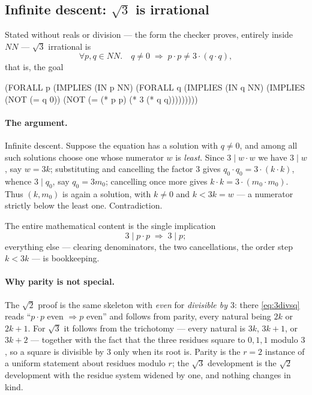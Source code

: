 \subsection{Infinite descent: \texorpdfstring{$\sqrt3$}{sqrt3} is irrational}
\label{sec:ex-sqrt3}

Stated without reals or division --- the form the checker proves, entirely
inside $\mathit{NN}$ --- $\sqrt3$ irrational is
\[
  \forall p,q \in \mathit{NN}.\quad
  q \neq 0 \;\Longrightarrow\; p\cdot p \neq 3\cdot(q\cdot q) ,
\]
that is, the goal
\begin{VNBsnip}
(FORALL p (IMPLIES (IN p NN) (FORALL q (IMPLIES (IN q NN)
  (IMPLIES (NOT (= q 0)) (NOT (= (* p p) (* 3 (* q q)))))))))
\end{VNBsnip}

\paragraph{The argument.}
Infinite descent.  Suppose the equation has a solution with $q \neq 0$, and
among all such solutions choose one whose numerator $w$ is \emph{least}.  Since
$3 \mid w\cdot w$ we have $3 \mid w$, say $w = 3k$; substituting and cancelling
the factor $3$ gives $q_0\cdot q_0 = 3\cdot(k\cdot k)$, whence $3 \mid q_0$, say
$q_0 = 3m_0$; cancelling once more gives $k\cdot k = 3\cdot(m_0\cdot m_0)$.  Thus
$(k,m_0)$ is again a solution, with $k \neq 0$ and $k < 3k = w$ --- a numerator
strictly below the least one.  Contradiction.

The entire mathematical content is the single implication
\begin{equation}\label{eq:3divsq}
  3 \mid p\cdot p \;\Longrightarrow\; 3 \mid p ;
\end{equation}
everything else --- clearing denominators, the two cancellations, the order
step $k < 3k$ --- is bookkeeping.

\paragraph{Why parity is not special.}
The $\sqrt2$ proof is the same skeleton with \emph{even} for \emph{divisible by
$3$}: there \eqref{eq:3divsq} reads ``$p\cdot p$ even $\Rightarrow p$ even'' and
follows from parity, every natural being $2k$ or $2k+1$.  For $\sqrt3$ it follows
from the trichotomy --- every natural is $3k$, $3k+1$, or $3k+2$ --- together
with the fact that the three residues square to $0,1,1$ modulo $3$, so a square
is divisible by $3$ only when its root is.  Parity is the $r=2$ instance of a
uniform statement about residues modulo $r$; the $\sqrt3$ development is the
$\sqrt2$ development with the residue system widened by one, and nothing changes
in kind.


